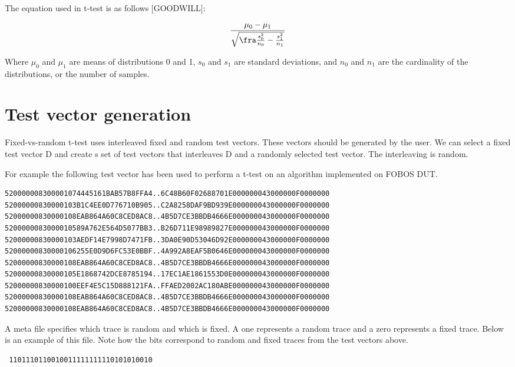 The equation used in t-test is as follows [GOODWILL]:

$$
\frac{\mu_0 - \mu_1}{\sqrt{\fra\frac{s_0^2}{n_0} - \frac{s_1^2}{n_1}}}
$$

Where $\mu_0$ and $\mu_1$ are means of distributions 0 and 1, $s_0$ and $s_1$ are standard deviations, and $n_0$ and $n_1$ are the cardinality of the distributions, or the number of samples. 

\section{Test vector generation}
Fixed-vs-random t-test uses interleaved fixed and random test vectors. These vectors should be generated by the user.
We can select a fixed test vector D and create s set of test vectors that interleaves D and a randomly selected test vector. The interleaving is random.

For example the following test vector has been used to perform a t-test on an algorithm implemented on FOBOS DUT.

\begin{verbatim}
520000008300001074445161BAB57B8FFA4..6C48B60F02688701E000000043000000F0000000
52000000830000103B1C4EE0D776710B905..C2A8258DAF9BD939E000000043000000F0000000
52000000830000108EAB864A60C8CED8AC8..4B5D7CE3BBDB4666E000000043000000F0000000
5200000083000010589A762E564D5077BB3..B26D711E98989827E000000043000000F0000000
52000000830000103AEDF14E7998D7471FB..3DA0E90D53046D92E000000043000000F0000000
52000000830000106255E0D9D6FC53E0BBF..4A992A8EAF5B0646E000000043000000F0000000
52000000830000108EAB864A60C8CED8AC8..4B5D7CE3BBDB4666E000000043000000F0000000
52000000830000105E1868742DCE8785194..17EC1AE1861553D0E000000043000000F0000000
52000000830000100EEF4E5C15D888121FA..FFAED2002AC180ABE000000043000000F0000000
52000000830000108EAB864A60C8CED8AC8..4B5D7CE3BBDB4666E000000043000000F0000000
52000000830000108EAB864A60C8CED8AC8..4B5D7CE3BBDB4666E000000043000000F0000000
\end{verbatim}
\newline
A meta file specifies which trace is random and which is fixed. A one represents a random trace and a zero represents a fixed trace.
Below is an example of this file. Note how the bits correspond to random and fixed traces from the test vectors above.
\begin{verbatim}
 1101110110010011111111110101010010
\end{verbatim}



